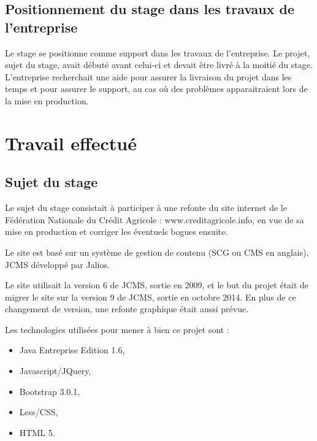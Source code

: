 \documentclass[12pt,a4paper]{article}
\begin{document}
\subsection{Positionnement du stage dans les travaux de l'entreprise}
Le stage se positionne comme support dans les travaux de l'entreprise. Le projet, sujet du stage, avait débuté avant celui-ci et devait être livré à la moitié du stage. L'entreprise recherchait une aide pour assurer la livraison du projet dans les temps et pour assurer le support, au cas où des problèmes apparaitraient lors de la mise en production.

\newpage

\section{Travail effectué}
\subsection{Sujet du stage}
Le sujet du stage consistait à participer à une refonte du site internet de le Fédération Nationale du Crédit Agricole : www.creditagricole.info, en vue de sa mise en production et corriger les éventuels bogues ensuite.\par
Le site est basé sur un système de gestion de contenu (SCG ou CMS en anglais), \gls{JCMS} développé par Jalios.\par
Le site utilisait la version 6 de \gls{JCMS}, sortie en 2009, et le but du projet était de migrer le site sur la version 9 de \gls{JCMS}, sortie en octobre 2014. En plus de ce changement de version, une refonte graphique était aussi prévue.\par
Les technologies utilisées pour mener à bien ce projet sont :
\begin{itemize}
\item Java Entreprise Edition 1.6,
\item Javascript/JQuery,
\item Bootstrap 3.0.1,
\item Less/\gls{CSS},
\item \gls{HTML} 5.
\end{itemize}
\end{document}

